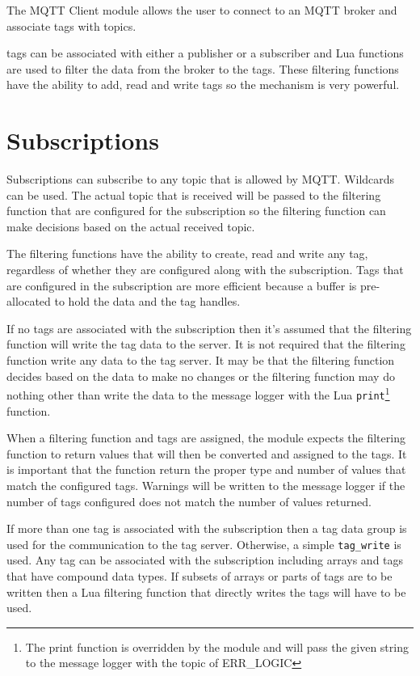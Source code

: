 The MQTT Client module allows the user to connect to an MQTT broker and
associate tags with topics.

\opendax tags can be associated with either a publisher or a subscriber and Lua
functions are used to filter the data from the broker to the \opendax tags. 
These filtering functions have the ability to add, read and write tags so the
mechanism is very powerful.

\section{Subscriptions}

Subscriptions can subscribe to any topic that is allowed by MQTT.  Wildcards can
be used.  The actual topic that is received will be passed to the filtering
function that are configured for the subscription so the filtering function can
make decisions based on the actual received topic.

The filtering functions have the ability to create, read and write any tag,
regardless of whether they are configured along with the subscription.  Tags
that are configured in the subscription are more efficient because a buffer is
pre-allocated to hold the data and the tag handles.

If no tags are associated with the subscription then it's assumed that the
filtering function will write the tag data to the server.  It is not required
that the filtering function write any data to the tag server.  It may be that
the filtering function decides based on the data to make no changes or the
filtering function may do nothing other than write the data to the message
logger with the Lua \texttt{print}\footnote{The print function is overridden by
	the module and will pass the given string to the message logger with the topic
	of ERR\_LOGIC} function.

When a filtering function and tags are assigned, the module expects the
filtering function to return values that will then be converted and assigned to
the tags.  It is important that the function return the proper type and number
of values that match the configured tags.  Warnings will be written to the
message logger if the number of tags configured does not match the number of
values returned.

If more than one tag is associated with the subscription then a tag data group
is used for the communication to the tag server.  Otherwise, a simple
\texttt{tag\_write} is used.  Any tag can be associated with the subscription
including arrays and tags that have compound data types.  If subsets of arrays
or parts of tags are to be written then a Lua filtering function that directly
writes the tags will have to be used.

